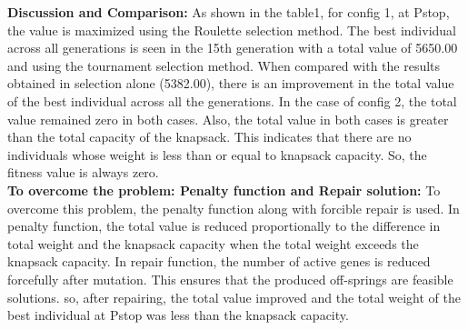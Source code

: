 \documentclass{article}
\begin{document}
{{{{\begin{table}[H]
\centering
{}
\caption{Best Individual across all generations} 
\end{table}

\textbf {Discussion and Comparison: }
As shown in the table1, for config 1, at Pstop, the value is maximized using the Roulette selection method. The best individual across all generations is seen in the 15th generation with a total value of 5650.00 and using the tournament selection method.
When compared with the results obtained in selection alone (5382.00), there is an improvement in the total value of the best individual across all the generations.
In the case of config 2, the total value remained zero in both cases. Also, the total value in both cases is greater than the total capacity of the knapsack. This indicates that there are no individuals whose weight is less than or equal to knapsack capacity. So, the fitness value is always zero. \\
\textbf {To overcome the problem: Penalty function and Repair solution: }
To overcome this problem, the penalty function along with forcible repair is used. In penalty function, the total value is reduced proportionally to the difference in total weight and the knapsack capacity when the total weight exceeds the knapsack capacity. In repair function, the number of active genes is reduced forcefully after mutation. This ensures that the produced off-springs are feasible solutions. so, after repairing, the total value improved and the total weight of the best individual at Pstop was less than the knapsack capacity.

}}}}
\end{document}
